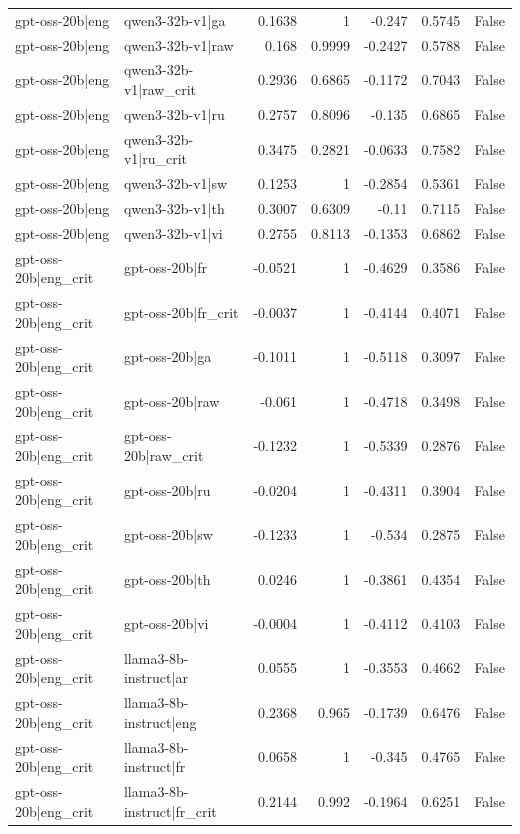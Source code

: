 \begin{table}
\begin{tabular}{l l r r r r l}
gpt-oss-20b|eng & qwen3-32b-v1|ga & 0.1638 & 1 & -0.247 & 0.5745 & False \\
gpt-oss-20b|eng & qwen3-32b-v1|raw & 0.168 & 0.9999 & -0.2427 & 0.5788 & False \\
gpt-oss-20b|eng & qwen3-32b-v1|raw_crit & 0.2936 & 0.6865 & -0.1172 & 0.7043 & False \\
gpt-oss-20b|eng & qwen3-32b-v1|ru & 0.2757 & 0.8096 & -0.135 & 0.6865 & False \\
gpt-oss-20b|eng & qwen3-32b-v1|ru_crit & 0.3475 & 0.2821 & -0.0633 & 0.7582 & False \\
gpt-oss-20b|eng & qwen3-32b-v1|sw & 0.1253 & 1 & -0.2854 & 0.5361 & False \\
gpt-oss-20b|eng & qwen3-32b-v1|th & 0.3007 & 0.6309 & -0.11 & 0.7115 & False \\
gpt-oss-20b|eng & qwen3-32b-v1|vi & 0.2755 & 0.8113 & -0.1353 & 0.6862 & False \\
gpt-oss-20b|eng_crit & gpt-oss-20b|fr & -0.0521 & 1 & -0.4629 & 0.3586 & False \\
gpt-oss-20b|eng_crit & gpt-oss-20b|fr_crit & -0.0037 & 1 & -0.4144 & 0.4071 & False \\
gpt-oss-20b|eng_crit & gpt-oss-20b|ga & -0.1011 & 1 & -0.5118 & 0.3097 & False \\
gpt-oss-20b|eng_crit & gpt-oss-20b|raw & -0.061 & 1 & -0.4718 & 0.3498 & False \\
gpt-oss-20b|eng_crit & gpt-oss-20b|raw_crit & -0.1232 & 1 & -0.5339 & 0.2876 & False \\
gpt-oss-20b|eng_crit & gpt-oss-20b|ru & -0.0204 & 1 & -0.4311 & 0.3904 & False \\
gpt-oss-20b|eng_crit & gpt-oss-20b|sw & -0.1233 & 1 & -0.534 & 0.2875 & False \\
gpt-oss-20b|eng_crit & gpt-oss-20b|th & 0.0246 & 1 & -0.3861 & 0.4354 & False \\
gpt-oss-20b|eng_crit & gpt-oss-20b|vi & -0.0004 & 1 & -0.4112 & 0.4103 & False \\
gpt-oss-20b|eng_crit & llama3-8b-instruct|ar & 0.0555 & 1 & -0.3553 & 0.4662 & False \\
gpt-oss-20b|eng_crit & llama3-8b-instruct|eng & 0.2368 & 0.965 & -0.1739 & 0.6476 & False \\
gpt-oss-20b|eng_crit & llama3-8b-instruct|fr & 0.0658 & 1 & -0.345 & 0.4765 & False \\
gpt-oss-20b|eng_crit & llama3-8b-instruct|fr_crit & 0.2144 & 0.992 & -0.1964 & 0.6251 & False \\

\end{tabular}
\end{table}
